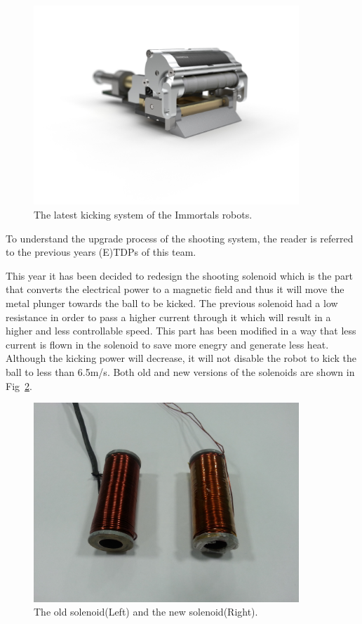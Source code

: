\documentclass[runningheads]{llncs}
\begin{document}
\begin{figure}
\centering
\includegraphics[width=10cm]{images/kicking_system.jpg}
\caption{The latest kicking system of the Immortals robots.} \label{fig_Kick_Sys}
\end{figure}

To understand the upgrade process of the shooting system, the reader is referred to the previous years (E)TDPs of this team.

This year it has been decided to redesign the shooting solenoid which is the part that converts the electrical power to a magnetic field and thus it will move the metal plunger towards the ball to be kicked. The previous solenoid had a low resistance in order to pass a higher current through it which will result in a higher and less controllable speed. This part has been modified in a way that less current is flown in the solenoid to save more enegry and generate less heat. Although the kicking power will decrease, it will not disable the robot to kick the ball to less than 6.5m/s. Both old and new versions of the solenoids are shown in Fig~\ref{fig_solenoid}.

\begin{figure}
\centering
\includegraphics[width=10cm]{images/solenoid.jpg}
\caption{The old solenoid(Left) and the new solenoid(Right).} \label{fig_solenoid}
\end{figure}
\end{document}
